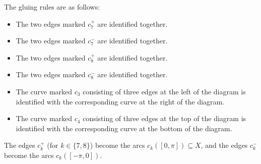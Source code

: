 \documentclass[reqno]{amsart}
\newcommand{\sse}       {\subseteq}
\renewcommand{\:}{\colon}
\theoremstyle{definition}
\begin{document}
The gluing rules are as follows:
\begin{itemize}
 \item The two edges marked $c_7^+$ are identified together.
 \item The two edges marked $c_7^-$ are identified together.
 \item The two edges marked $c_8^+$ are identified together.
 \item The two edges marked $c_8^-$ are identified together.
 \item The curve marked $c_3$ consisting of three edges at the left of
  the diagram is identified with the corresponding curve at the right
  of the diagram.
 \item The curve marked $c_4$ consisting of three edges at the top of
  the diagram is identified with the corresponding curve at the bottom
  of the diagram.
\end{itemize}
The edges $c_k^+$ (for $k\in\{7,8\}$) become the arcs
$c_k([0,\pi])\sse X$, and the edges $c_k^-$ become the arcs
$c_k([-\pi,0])$.

\end{document}
